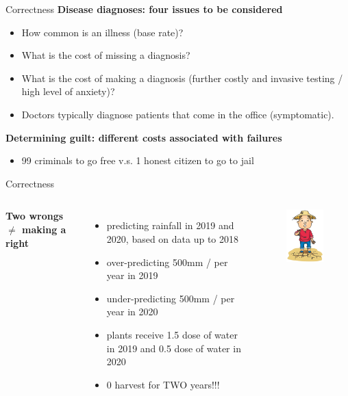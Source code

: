 \documentclass{beamer}
\begin{document}
\begin{frame}{Correctness}
\textbf{Disease diagnoses: four issues to be considered}
\begin{itemize}
\item  How common is an illness (base rate)?
\item What is the cost of missing a diagnosis?
\item What is the cost of making a diagnosis (further costly and invasive testing / high level of anxiety)?
\item Doctors typically diagnose patients that come in the office (symptomatic).
\end{itemize}
\textbf{Determining guilt: different costs associated with failures}
\begin{itemize}
\item 99 criminals to go free v.s. 1 honest citizen to go to jail
\end{itemize}
\end{frame}

\begin{frame}{Correctness}
\begin{columns}
\textbf{Two wrongs $\neq$ making a right}
\begin{itemize}
\item predicting rainfall in 2019 and 2020, based on data up to 2018 
\item over-predicting 500mm / per year in 2019
\item under-predicting 500mm / per year in 2020
\item plants receive 1.5 dose of water in 2019 and 0.5 dose of water in 2020
\item 0 harvest for TWO years!!!
\end{itemize}
\begin{figure}
\centering
\includegraphics[width=3cm]{ep9.jpeg}
\end{figure}
\end{columns}
\end{frame}
\end{document}
